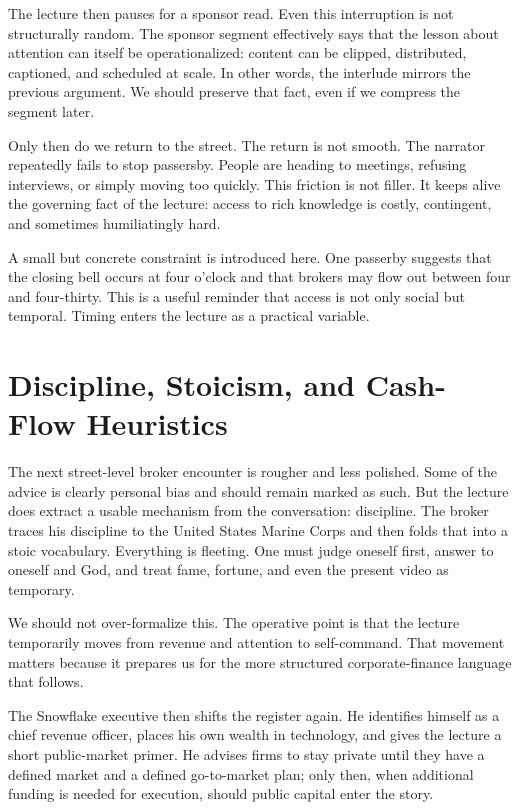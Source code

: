The lecture then pauses for a sponsor read. Even this interruption is not structurally random. The sponsor segment effectively says that the lesson about attention can itself be operationalized: content can be clipped, distributed, captioned, and scheduled at scale. In other words, the interlude mirrors the previous argument. We should preserve that fact, even if we compress the segment later.

Only then do we return to the street. The return is not smooth. The narrator repeatedly fails to stop passersby. People are heading to meetings, refusing interviews, or simply moving too quickly. This friction is not filler. It keeps alive the governing fact of the lecture: access to rich knowledge is costly, contingent, and sometimes humiliatingly hard.

A small but concrete constraint is introduced here. One passerby suggests that the closing bell occurs at four o'clock and that brokers may flow out between four and four-thirty. This is a useful reminder that access is not only social but temporal. Timing enters the lecture as a practical variable.

\section{Discipline, Stoicism, and Cash-Flow Heuristics}

The next street-level broker encounter is rougher and less polished. Some of the advice is clearly personal bias and should remain marked as such. But the lecture does extract a usable mechanism from the conversation: discipline. The broker traces his discipline to the United States Marine Corps and then folds that into a stoic vocabulary. Everything is fleeting. One must judge oneself first, answer to oneself and God, and treat fame, fortune, and even the present video as temporary.

We should not over-formalize this. The operative point is that the lecture temporarily moves from revenue and attention to self-command. That movement matters because it prepares us for the more structured corporate-finance language that follows.

The Snowflake executive then shifts the register again. He identifies himself as a chief revenue officer, places his own wealth in technology, and gives the lecture a short public-market primer. He advises firms to stay private until they have a defined market and a defined go-to-market plan; only then, when additional funding is needed for execution, should public capital enter the story.


